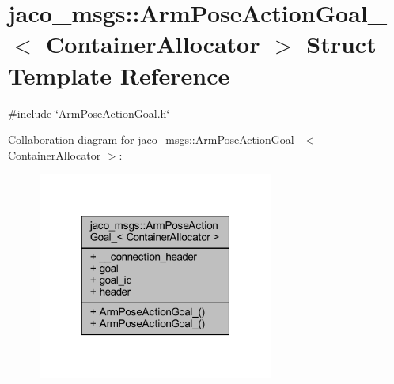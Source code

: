 \hypertarget{structjaco__msgs_1_1ArmPoseActionGoal__}{}\section{jaco\+\_\+msgs\+:\+:Arm\+Pose\+Action\+Goal\+\_\+$<$ Container\+Allocator $>$ Struct Template Reference}
\label{structjaco__msgs_1_1ArmPoseActionGoal__}


{\ttfamily \#include \char`\"{}Arm\+Pose\+Action\+Goal.\+h\char`\"{}}



Collaboration diagram for jaco\+\_\+msgs\+:\+:Arm\+Pose\+Action\+Goal\+\_\+$<$ Container\+Allocator $>$\+:
\nopagebreak
\begin{figure}[H]
\begin{center}
\leavevmode
\includegraphics[width=220pt]{df/da3/structjaco__msgs_1_1ArmPoseActionGoal____coll__graph}
\end{center}
\end{figure}

